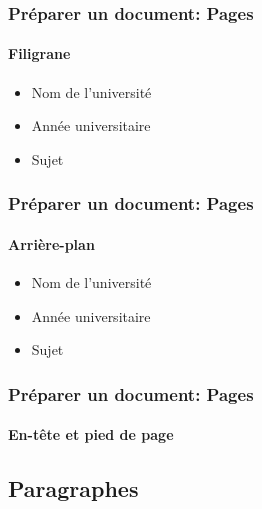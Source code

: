 \documentclass[xcolor=table]{beamer}
\begin{document}
\begin{frame}[t]
\frametitle{Préparer un document: Pages}
\framesubtitle{Filigrane}

\begin{minipage}{0.43\textwidth}
\begin{itemize}
\item Nom de l'université 
\item Année universitaire
\item Sujet
\end{itemize}
\end{minipage}
\begin{minipage}{0.55\textwidth}
\end{minipage}

\end{frame}

\begin{frame}[t]
\frametitle{Préparer un document: Pages}
\framesubtitle{Arrière-plan}

\begin{minipage}{0.43\textwidth}
\begin{itemize}
\item Nom de l'université 
\item Année universitaire
\item Sujet
\end{itemize}
\end{minipage}
\begin{minipage}{0.55\textwidth}
\end{minipage}

\end{frame}


\begin{frame}
\frametitle{Préparer un document: Pages}
\framesubtitle{En-tête et pied de page}

\end{frame}


\subsection{Paragraphes}
\end{document}
